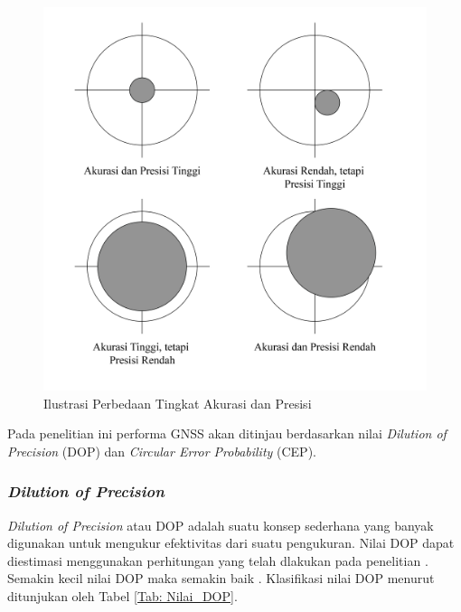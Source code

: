 \begin{figure}[H]
	\centering
	\includegraphics[width=12cm]{contents/chapter-2/acc.png}
	\caption{Ilustrasi Perbedaan Tingkat Akurasi dan Presisi}
	\label{Fig: acc-and-prec-diff}
\end{figure}

Pada penelitian ini performa GNSS akan ditinjau berdasarkan nilai \textit{Dilution of Precision} (DOP) dan \textit{Circular Error Probability} (CEP).

\subsubsection{\textit{Dilution of Precision}}
\textit{Dilution of Precision} atau DOP adalah suatu konsep sederhana yang banyak digunakan untuk mengukur efektivitas dari suatu pengukuran. Nilai DOP dapat diestimasi menggunakan perhitungan yang telah dlakukan pada penelitian \cite{Tahsin2015} . Semakin kecil nilai DOP maka semakin baik \cite{Hofmann-Wellenhof2008}. Klasifikasi nilai DOP menurut \cite{Langley1999} ditunjukan oleh Tabel \ref{Tab: Nilai_DOP}.

